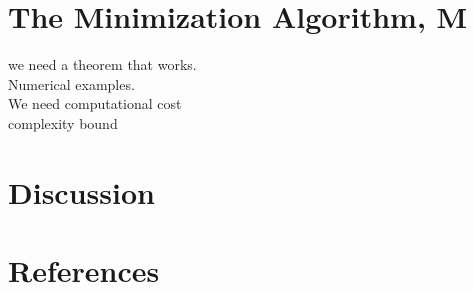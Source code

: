 \documentclass[review]{elsarticle}
\theoremstyle{definition}
\begin{document}
\section{The Minimization Algorithm, M}

we need a theorem that works.\\
Numerical examples.\\
We need computational cost\\
complexity bound \\

\section{Discussion}

\section*{References}


\end{document}
